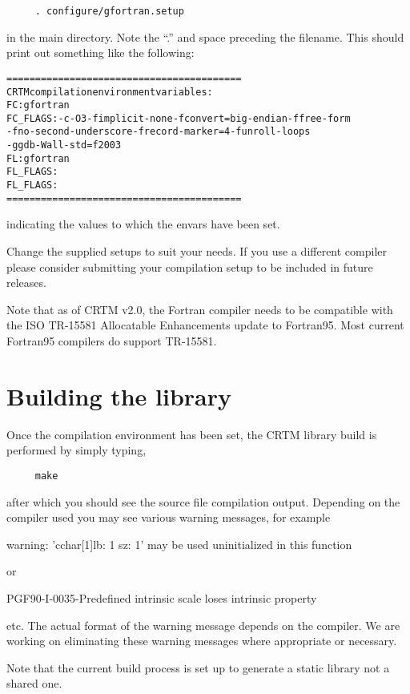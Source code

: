 \begin{verbatim}     . configure/gfortran.setup\end{verbatim}

in the main directory. Note the ``.'' and space preceding the filename. This should print out something like the following:
\begin{alltt}
  =========================================
   CRTM compilation environment variables:
     FC:       gfortran
     FC_FLAGS:  -c  -O3  -fimplicit-none  -fconvert=big-endian  -ffree-form
                -fno-second-underscore  -frecord-marker=4  -funroll-loops
                -ggdb  -Wall  -std=f2003  
     FL:       gfortran
     FL_FLAGS:  
     FL_FLAGS: 
  =========================================\end{alltt}

indicating the values to which the envars have been set.

Change the supplied setups to suit your needs. If you use a different compiler please consider submitting your compilation setup to be included in future releases.

Note that as of CRTM v2.0, the Fortran compiler needs to be compatible with the ISO TR-15581 Allocatable Enhancements update to Fortran95. Most current Fortran95 compilers do support TR-15581.


\section{Building the library}
Once the compilation environment has been set, the CRTM library build is performed by simply typing,

\begin{verbatim}     make\end{verbatim}
   
after which you should see the source file compilation output. Depending on the compiler used you may see various warning messages, for example

\f{  warning: 'cchar[1]{lb: 1 sz: 1}' may be used uninitialized in this function}

or

\f{  PGF90-I-0035-Predefined intrinsic scale loses intrinsic property}

etc. The actual format of the warning message depends on the compiler. We are working on eliminating these warning messages where appropriate or necessary. 

Note that the current build process is set up to generate a static library not a shared one.


